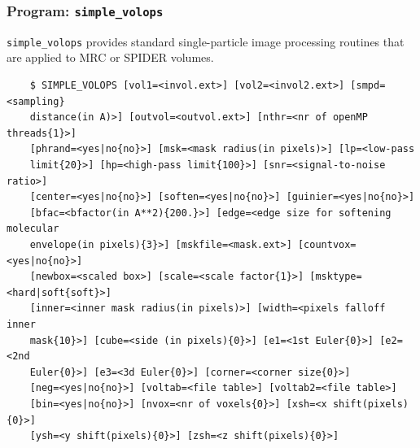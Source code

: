 \documentclass[a4paper,11pt]{article}
\newcommand{\prgname}[1]{\textcolor{NavyBlue}{\texttt{#1}}}
\begin{document}
\subsubsection{Program: \prgname{simple\_volops}}
\label{volops}
\prgname{simple\_volops} provides standard single-particle image processing routines that are applied to MRC or SPIDER volumes.
\begin{verbatim}
    $ SIMPLE_VOLOPS [vol1=<invol.ext>] [vol2=<invol2.ext>] [smpd=<sampling}
    distance(in A)>] [outvol=<outvol.ext>] [nthr=<nr of openMP threads{1}>]
    [phrand=<yes|no{no}>] [msk=<mask radius(in pixels)>] [lp=<low-pass
    limit{20}>] [hp=<high-pass limit{100}>] [snr=<signal-to-noise ratio>]
    [center=<yes|no{no}>] [soften=<yes|no{no}>] [guinier=<yes|no{no}>]
    [bfac=<bfactor(in A**2){200.}>] [edge=<edge size for softening molecular
    envelope(in pixels){3}>] [mskfile=<mask.ext>] [countvox=<yes|no{no}>]
    [newbox=<scaled box>] [scale=<scale factor{1}>] [msktype=<hard|soft{soft}>]
    [inner=<inner mask radius(in pixels)>] [width=<pixels falloff inner
    mask{10}>] [cube=<side (in pixels){0}>] [e1=<1st Euler{0}>] [e2=<2nd
    Euler{0}>] [e3=<3d Euler{0}>] [corner=<corner size{0}>]
    [neg=<yes|no{no}>] [voltab=<file table>] [voltab2=<file table>]
    [bin=<yes|no{no}>] [nvox=<nr of voxels{0}>] [xsh=<x shift(pixels){0}>]
    [ysh=<y shift(pixels){0}>] [zsh=<z shift(pixels){0}>]
\end{verbatim}
\end{document}
